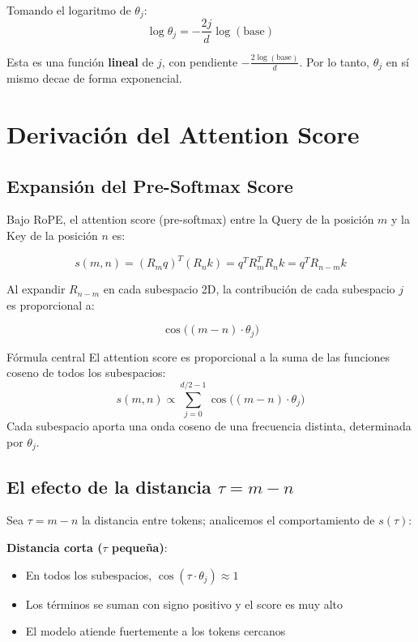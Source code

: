 \documentclass[a4paper]{article}
\begin{document}
Tomando el logaritmo de $\theta_j$:
$$
\log \theta_j = -\frac{2j}{d} \log(\text{base})
$$

Esta es una función \textbf{lineal} de $j$, con pendiente $-\frac{2\log(\text{base})}{d}$. Por lo tanto, $\theta_j$ en sí mismo decae de forma exponencial.

\section{Derivación del Attention Score}

\subsection{Expansión del Pre-Softmax Score}

Bajo RoPE, el attention score (pre-softmax) entre la Query de la posición $m$ y la Key de la posición $n$ es:

$$
s(m,n) = (R_m q)^T (R_n k) = q^T R_m^T R_n k = q^T R_{n-m} k
$$

Al expandir $R_{n-m}$ en cada subespacio 2D, la contribución de cada subespacio $j$ es proporcional a:

$$
\cos\big((m-n) \cdot \theta_j\big)
$$

\begin{importantbox}{Fórmula central}
El attention score es proporcional a la suma de las funciones coseno de todos los subespacios:
$$
s(m,n) \propto \sum_{j=0}^{d/2-1} \cos\big((m-n) \cdot \theta_j\big)
$$
Cada subespacio aporta una onda coseno de una frecuencia distinta, determinada por $\theta_j$.
\end{importantbox}

\subsection{El efecto de la distancia $\tau = m - n$}

Sea $\tau = m - n$ la distancia entre tokens; analicemos el comportamiento de $s(\tau)$:

\textbf{Distancia corta ($\tau$ pequeña)}:
\begin{itemize}
  \item En todos los subespacios, $\cos(\tau \cdot \theta_j) \approx 1$
  \item Los términos se suman con signo positivo y el score es muy alto
  \item El modelo atiende fuertemente a los tokens cercanos
\end{itemize}
\end{document}
